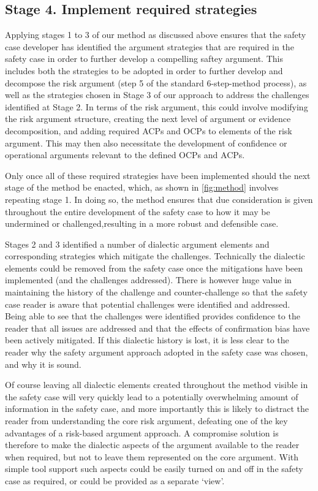 \subsection{Stage 4. Implement required strategies}

Applying stages 1 to 3 of our method as discussed above ensures that the safety case developer has identified the argument strategies that are required in the safety case in order to further develop a compelling saftey argument. This includes both the strategies to be adopted in order to further develop and decompose the risk argument (step 5 of the standard 6-step-method process), as well as the strategies chosen in Stage 3 of our approach to address the challenges identified at Stage 2. In terms of the risk argument, this could involve modifying the risk argument structure, creating the next level of argument or evidence decomposition, and adding required ACPs and OCPs to elements of the risk argument. This may then also necessitate the development of confidence or operational arguments relevant to the defined OCPs and ACPs.

Only once all of these required strategies have been implemented should the next stage of the method be enacted, which, as shown in \ref{fig:method} involves repeating stage 1. In doing so, the method ensures that due consideration is given throughout the entire development of the safety case to how it may be undermined or challenged,resulting in a more robust and defensible case. 

Stages 2 and 3 identified a number of dialectic argument elements and corresponding strategies which mitigate the challenges. Technically the dialectic elements could be removed from the safety case once the mitigations have been implemented (and the challenges addressed). There is however huge value in maintaining the history of the challenge and counter-challenge so that the safety case reader is aware that potential challenges were identified and addressed. Being able to see that the challenges were identified provides confidence to the reader that all issues are addressed and that the effects of confirmation bias have been actively mitigated. If this dialectic history is lost, it is less clear to the reader why the safety argument approach adopted in the safety case was chosen, and why it is sound.

Of course leaving all dialectic elements created throughout the method visible in the safety case will very quickly lead to a potentially overwhelming amount of information in the safety case, and more importantly this is likely to distract the reader from understanding the core risk argument, defeating one of the key advantages of a risk-based argument approach. A compromise solution is therefore to make the dialectic aspects of the argument available to the reader when required, but not to leave them represented on the core argument. With simple tool support such aspects could be easily turned on and off in the safety case as required, or could be provided as a separate `view'.


